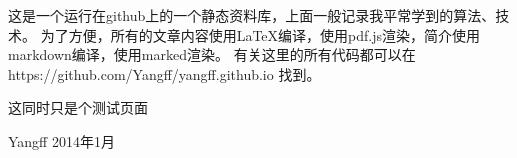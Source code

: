 \documentclass[12pt,a4paper]{ctexart}
\begin{document}
这是一个运行在github上的一个静态资料库，上面一般记录我平常学到的算法、技术。
为了方便，所有的文章内容使用LaTeX编译，使用pdf.js渲染，简介使用markdown编译，使用marked渲染。
有关这里的所有代码都可以在 https://github.com/Yangff/yangff.github.io 找到。

这同时只是个测试页面

Yangff 2014年1月
\end{document}
